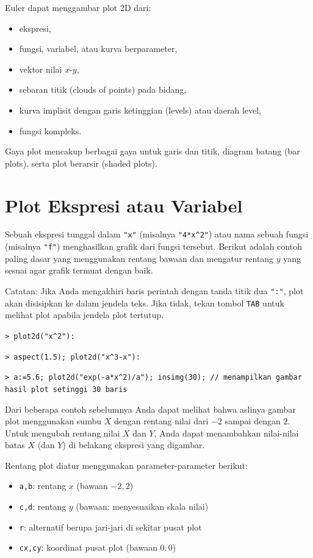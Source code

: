 \documentclass[11pt, a4paper]{article}
\newcommand{\emtcmd}[1]{\noindent\texttt{\textcolor{emtcommand}{>}\ #1}\par\smallskip}
\begin{document}
Euler dapat menggambar plot 2D dari:
\begin{itemize}
    \item ekspresi,
    \item fungsi, variabel, atau kurva berparameter,
    \item vektor nilai $x$-$y$,
    \item sebaran titik (clouds of points) pada bidang,
    \item kurva implisit dengan garis ketinggian (levels) atau daerah level,
    \item fungsi kompleks.
\end{itemize}

Gaya plot mencakup berbagai gaya untuk garis dan titik, diagram batang (bar plots), serta plot berarsir (shaded plots).

\section*{Plot Ekspresi atau Variabel}

Sebuah ekspresi tunggal dalam \texttt{"x"} (misalnya \texttt{"4*x\^{}2"}) atau nama sebuah fungsi (misalnya \texttt{"f"}) menghasilkan grafik dari fungsi tersebut. Berikut adalah contoh paling dasar yang menggunakan rentang bawaan dan mengatur rentang $y$ yang sesuai agar grafik termuat dengan baik.

Catatan: Jika Anda mengakhiri baris perintah dengan tanda titik dua \texttt{":"}, plot akan disisipkan ke dalam jendela teks. Jika tidak, tekan tombol \texttt{TAB} untuk melihat plot apabila jendela plot tertutup.

\emtcmd{plot2d("x\^{}2"):}
\emtcmd{aspect(1.5); plot2d("x\^{}3-x"):}
\emtcmd{a:=5.6; plot2d("exp(-a*x\^{}2)/a"); insimg(30); \textcolor{emtcomment}{// menampilkan gambar hasil plot setinggi 30 baris}}

Dari beberapa contoh sebelumnya Anda dapat melihat bahwa aslinya gambar plot menggunakan sumbu $X$ dengan rentang nilai dari $-2$ sampai dengan $2$. Untuk mengubah rentang nilai $X$ dan $Y$, Anda dapat menambahkan nilai-nilai batas $X$ (dan $Y$) di belakang ekspresi yang digambar.

Rentang plot diatur menggunakan parameter-parameter berikut:
\begin{itemize}
    \item \texttt{a,b}: rentang $x$ (bawaan $-2,2$)
    \item \texttt{c,d}: rentang $y$ (bawaan: menyesuaikan skala nilai)
    \item \texttt{r}: alternatif berupa jari-jari di sekitar pusat plot
    \item \texttt{cx,cy}: koordinat pusat plot (bawaan $0,0$)
\end{itemize}
\end{document}
